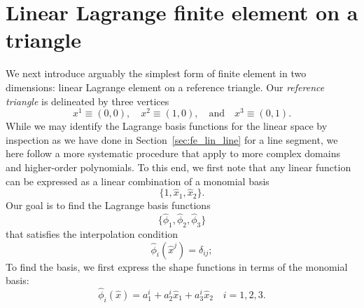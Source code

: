 
\section{Linear Lagrange finite element on a triangle}
\label{sec:fe_lin_tri}
We next introduce arguably the simplest form of finite element in two dimensions: linear Lagrange element on a reference triangle.  Our \emph{reference triangle} is delineated by three vertices
\begin{equation*}
  x^1 \equiv (0,0), \quad x^2 \equiv (1,0), \quad \text{and} \quad x^3 \equiv (0,1).
\end{equation*}
While we may identify the Lagrange basis functions for the linear space by inspection as we have done in Section~\ref{sec:fe_lin_line} for a line segment, we here follow a more systematic procedure that apply to more complex domains and higher-order polynomials.  To this end, we first note that any linear function can be expressed as a linear combination of a monomial basis
\begin{equation*}
  \{ 1, \hat x_1, \hat x_2\}.
\end{equation*}
Our goal is to find the Lagrange basis functions
\begin{equation*}
  \{ \hat \phi_1, \hat \phi_2, \hat \phi_3 \}
\end{equation*}
that satisfies the interpolation condition
\begin{equation}
  \hat \phi_i(\hat x^j) = \delta_{ij};  \label{eq:fe_interp_tri}
\end{equation}
To find the basis, we first express the shape functions in terms of the monomial basis:
\begin{equation}
  \hat \phi_i(\hat x) = a^i_1 + a^i_2 \hat x_1 + a_3^i \hat x_2 \quad i = 1, 2, 3.
  \label{eq:fe_lin_tri_rep}
\end{equation}
